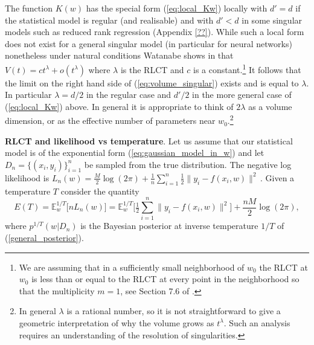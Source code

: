 \documentclass{article} %
\begin{document}
The function $K(w)$ has the special form (\ref{eq:local_Kw}) locally with $d' = d$ if the statistical model is regular (and realisable) and with $d' < d$ in some singular models such as reduced rank regression (Appendix \ref{??}). While such a local form does not exist for a general singular model (in particular for neural networks) nonetheless under natural conditions Watanabe shows in \citet[Theorem 7.1]{watanabe_algebraic_2009} that
$
V(t) = c t^\lambda + o( t^\lambda)
$
where $\lambda$ is the RLCT and $c$ is a constant.\footnote{We are assuming that in a sufficiently small neighborhood of $w_0$ the RLCT at $w_0$ is less than or equal to the RLCT at every point in the neighborhood so that the multiplicity $m = 1$, see Section 7.6 of \citep{watanabe_algebraic_2009}.} It follows that the limit on the right hand side of  (\ref{eq:volume_singular}) exists and is equal to $\lambda$. In particular $\lambda = d/2$ in the regular case and $d'/2$ in the more general case of (\ref{eq:local_Kw}) above. In general it is appropriate to think of $2 \lambda$ as a volume dimension, or as the effective number of parameters near $w_0$.\footnote{In general $\lambda$ is a rational number, so it is not straightforward to give a geometric interpretation of why the volume grows as $t^\lambda$. Such an analysis requires an understanding of the resolution of singularities.}


\textbf{RLCT and likelihood vs temperature}. Let us assume that our statistical model is of the exponential form  (\ref{eq:gaussian_model_in_w}) and let $D_n = \{ (x_i,y_i) \}_{i=1}^n$ be sampled from the true distribution. The negative log likelihood is
$
L_n(w) = \frac{M}{2} \log(2\pi) + \frac{1}{n} \sum_{i=1}^n \frac{1}{2} \| y_i - f(x_i,w) \|^2\,.
$
Given a temperature $T$ consider the quantity
$$
E(T) = \mathbb{E}^{1/T}_w\big[nL_n(w) \big] = \mathbb{E}_w^{1/T}\Big[ \tfrac{1}{2} \sum_{i=1}^n \| y_i - f(x_i, w) \|^2 \Big] + \frac{nM}{2} \log(2\pi),
$$
where $p^{1/T}(w|D_n)$ is the Bayesian posterior at inverse temperature $1/T$ of (\ref{general_posterior}).
\end{document}
